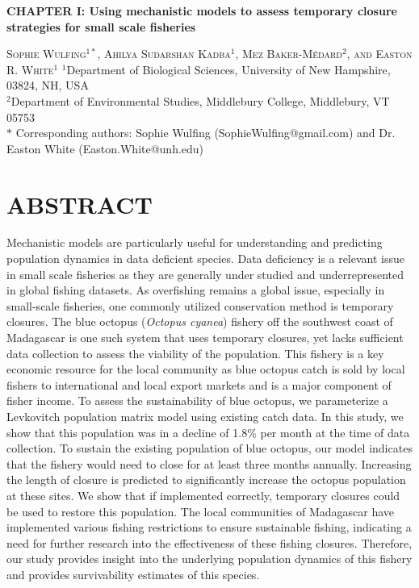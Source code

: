 \documentclass[
]{article}
\author{}
\date{\vspace{-2.5em}}
\begin{document}
\setcounter{page}{6}

\begin{center}
    
\textbf{\Large CHAPTER I: Using mechanistic models to assess temporary closure strategies for small scale fisheries}
    
\textsc{Sophie Wulfing$^{1*}$, Ahilya Sudarshan Kadba$^{1}$, Mez Baker-Médard$^{2}$, and Easton R. White$^{1}$}
\vspace{3 mm}
\normalsize{\indent $^1$Department of Biological Sciences, University of New Hampshire, 03824, NH, USA \\ $^2$Department of Environmental Studies, Middlebury College, Middlebury, VT 05753\\}
$\text{*}$ Corresponding authors: Sophie Wulfing (SophieWulfing@gmail.com) and Dr. Easton White (Easton.White@unh.edu)
\end{center}

\newpage

\linenumbers

\hypertarget{abstract}{%
\section{ABSTRACT}\label{abstract}}

Mechanistic models are particularly useful for understanding and predicting population dynamics in data deficient species. Data deficiency is a relevant issue in small scale fisheries as they are generally under studied and underrepresented in global fishing datasets. As overfishing remains a global issue, especially in small-scale fisheries, one commonly utilized conservation method is temporary closures. The blue octopus (\emph{Octopus cyanea}) fishery off the southwest coast of Madagascar is one such system that uses temporary closures, yet lacks sufficient data collection to assess the viability of the population. This fishery is a key economic resource for the local community as blue octopus catch is sold by local fishers to international and local export markets and is a major component of fisher income. To assess the sustainability of blue octopus, we parameterize a Levkovitch population matrix model using existing catch data. In this study, we show that this population was in a decline of 1.8\% per month at the time of data collection. To sustain the existing population of blue octopus, our model indicates that the fishery would need to close for at least three months annually. Increasing the length of closure is predicted to significantly increase the octopus population at these sites. We show that if implemented correctly, temporary closures could be used to restore this population. The local communities of Madagascar have implemented various fishing restrictions to ensure sustainable fishing, indicating a need for further research into the effectiveness of these fishing closures. Therefore, our study provides insight into the underlying population dynamics of this fishery and provides survivability estimates of this species.
\end{document}
